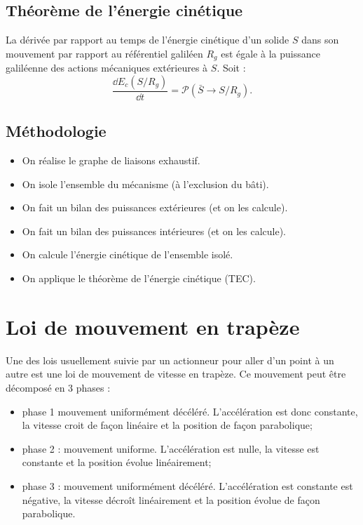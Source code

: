 \subsection{Théorème de l'énergie cinétique}

\begin{theoreme}

La dérivée par rapport au temps de l'énergie cinétique d'un solide $S$ dans son mouvement par rapport au référentiel galiléen $R_g$ est égale à la puissance galiléenne des actions mécaniques extérieures à $S$.
Soit :
$$
\dfrac{\dd E_c(S/R_g)}{\dd t}=\mathcal{P}(\bar S \rightarrow S/R_g).
$$

\end{theoreme}

\subsection{Méthodologie}
\begin{methode}

\begin{itemize}
\item On réalise le graphe de liaisons exhaustif. 
\item On isole l'ensemble du mécanisme (à l'exclusion du bâti).
\item On fait un bilan des puissances extérieures (et on les calcule).
\item On fait un bilan des puissances intérieures (et on les calcule).
\item On calcule l'énergie cinétique de l'ensemble isolé. 
\item On applique le théorème de l'énergie cinétique (TEC).
\end{itemize}
\end{methode}

\section{Loi de mouvement en trapèze}




Une des lois usuellement suivie par un actionneur pour aller d'un point à un autre est une loi de mouvement de vitesse en trapèze.  Ce mouvement peut être décomposé en 3 phases : 
\begin{itemize}
\item phase 1 mouvement uniformément décéléré. L'accélération est donc constante, la vitesse croit de façon linéaire et la position de façon parabolique;
\item phase 2 : mouvement uniforme. L'accélération est nulle, la vitesse est constante et la position évolue linéairement;
\item phase 3 : mouvement uniformément décéléré. L'accélération est constante est négative, la vitesse décroît linéairement et la position évolue de façon parabolique. 
\end{itemize}

